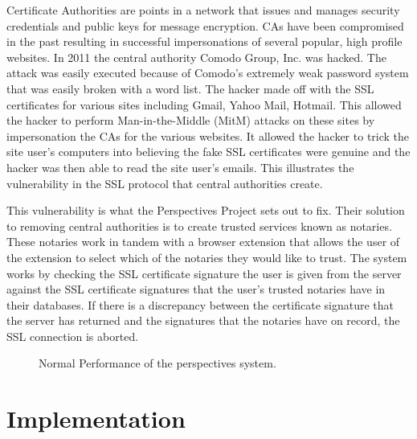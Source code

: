\documentclass[preprint,review,12pt]{elsarticle}
\begin{document}
Certificate Authorities are points in a network that issues and manages
security credentials and public keys for message encryption. CAs have been
compromised in the past resulting in successful impersonations of several
popular, high profile websites.  In 2011 the central authority Comodo Group,
Inc. was hacked. The attack was easily executed because of Comodo's extremely
weak password system that was easily broken with a word list. The hacker made
off with the SSL certificates for various sites including Gmail, Yahoo Mail,
Hotmail.  \citep{comodohack} This allowed the hacker to perform
Man-in-the-Middle (MitM) attacks on these sites by impersonation the CAs for
the various websites. It allowed the hacker to trick the site user's computers
into believing the fake SSL certificates were genuine and the hacker was then
able to read the site user's emails.  This illustrates the vulnerability in the
SSL protocol that central authorities create.

This vulnerability is what the Perspectives Project sets out to fix. Their
solution to removing central authorities is to create trusted services known as
notaries. These notaries work in tandem with a browser extension that allows
the user of the extension to select which of the notaries they would like to
trust. The system works by checking the SSL certificate signature the user is
given from the server against the SSL certificate signatures that the user's
trusted notaries have in their databases. If there is a discrepancy between the
certificate signature that the server has returned and the signatures that the
notaries have on record, the SSL connection is aborted.

\begin{figure}[h]
\caption{Normal Performance of the perspectives system.}
\end{figure}

\section{Implementation}
\label{implementation}
\end{document}
